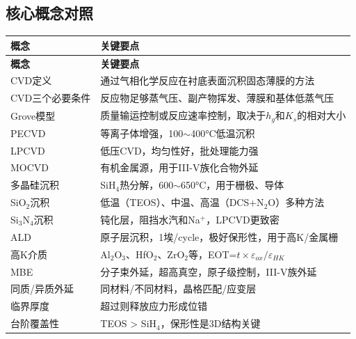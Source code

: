 \documentclass[UTF8,12pt,a4paper]{ctexart}
\begin{document}
\subsection{核心概念对照}

\begin{longtable}{|L{4cm}|L{11cm}|}
\hline
\textbf{概念} & \textbf{关键要点} \\
\hline
\endfirsthead
\hline
\textbf{概念} & \textbf{关键要点} \\
\hline
\endhead
\hline
\endfoot
\hline
\endlastfoot

CVD定义 & 通过气相化学反应在衬底表面沉积固态薄膜的方法 \\
\hline

CVD三个必要条件 & 反应物足够蒸气压、副产物挥发、薄膜和基体低蒸气压 \\
\hline

Grove模型 & 质量输运控制或反应速率控制，取决于$h_g$和$K_s$的相对大小 \\
\hline

PECVD & 等离子体增强，100$\sim$400°C低温沉积 \\
\hline

LPCVD & 低压CVD，均匀性好，批处理能力强 \\
\hline

MOCVD & 有机金属源，用于III-V族化合物外延 \\
\hline

多晶硅沉积 & SiH$_4$热分解，600$\sim$650°C，用于栅极、导体 \\
\hline

SiO$_2$沉积 & 低温（TEOS）、中温、高温（DCS+N$_2$O）多种方法 \\
\hline

Si$_3$N$_4$沉积 & 钝化层，阻挡水汽和Na$^+$，LPCVD更致密 \\
\hline

ALD & 原子层沉积，1埃/cycle，极好保形性，用于高K/金属栅 \\
\hline

高K介质 & Al$_2$O$_3$、HfO$_2$、ZrO$_2$等，EOT=$t \times \varepsilon_{ox}/\varepsilon_{HK}$ \\
\hline

MBE & 分子束外延，超高真空，原子级控制，III-V族外延 \\
\hline

同质/异质外延 & 同材料/不同材料，晶格匹配/应变层 \\
\hline

临界厚度 & 超过则释放应力形成位错 \\
\hline

台阶覆盖性 & TEOS > SiH$_4$，保形性是3D结构关键 \\
\hline

\end{longtable}
\end{document}

